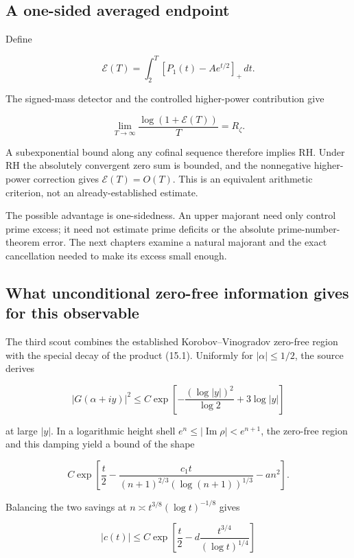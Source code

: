\documentclass[
  10pt,
  a4paper,
  10pt,
  oneside,
  openany]{book}
\begin{document}
\subsection{A one-sided averaged
endpoint}\label{a-one-sided-averaged-endpoint}

Define

\[
\mathcal E(T)=\int_2^T[P_1(t)-Ae^{t/2}]_+\,dt.
\tag{16.8}\label{eq:16.8}
\]

The signed-mass detector and the controlled higher-power contribution
give

\[
\lim_{T\to\infty}\frac{\log(1+\mathcal E(T))}{T}=R_\zeta.
\tag{16.9}\label{eq:16.9}
\]

A subexponential bound along any cofinal sequence therefore implies RH.
Under RH the absolutely convergent zero sum is bounded, and the
nonnegative higher-power correction gives \(\mathcal E(T)=O(T)\). This
is an equivalent arithmetic criterion, not an already-established
estimate.

The possible advantage is one-sidedness. An upper majorant need only
control prime excess; it need not estimate prime deficits or the
absolute prime-number-theorem error. The next chapters examine a natural
majorant and the exact cancellation needed to make its excess small
enough.

\subsection{What unconditional zero-free information gives for this
observable}\label{what-unconditional-zero-free-information-gives-for-this-observable}

The third scout combines the established Korobov--Vinogradov zero-free
region with the special decay of the product (15.1). Uniformly for
\(|\alpha|\le1/2\), the source derives

\[
|G(\alpha+iy)|^2
\le C\exp\left[-\frac{(\log|y|)^2}{\log2}+3\log|y|\right]
\tag{16.10}\label{eq:16.10}
\]

at large \(|y|\). In a logarithmic height shell
\(e^n\le|\operatorname{Im}\rho|<e^{n+1}\), the zero-free region and this
damping yield a bound of the shape

\[
C\exp\left[
\frac t2-
\frac{c_1t}{(n+1)^{2/3}(\log(n+1))^{1/3}}
-an^2\right].
\tag{16.11}\label{eq:16.11}
\]

Balancing the two savings at \(n\asymp t^{3/8}(\log t)^{-1/8}\) gives

\[
|c(t)|\le C\exp\left[
\frac t2-d\frac{t^{3/4}}{(\log t)^{1/4}}\right]
\tag{16.12}\label{eq:16.12}
\]
\end{document}
